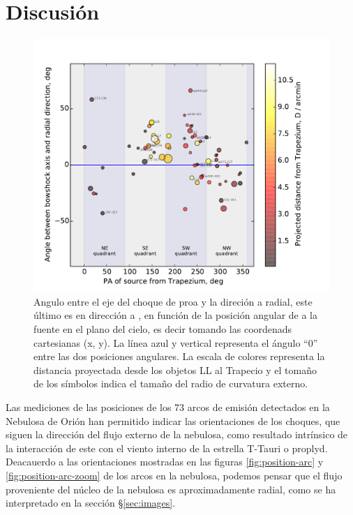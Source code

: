 \section{Discusión}
\label{sec:disc}

\begin{figure}
  \centering
  \includegraphics[width=\linewidth, clip]{luis-programas/will-PA-vs-PA}
  \caption{Angulo entre el eje del choque de proa y la direción a radial, este último es en dirección a \thC{}, en función de la posición angular de \thC{} a la fuente en el plano del cielo, es decir tomando las coordenads cartesianas (x, y). La línea azul y vertical representa el ángulo ``0'' entre las dos posiciones angulares. La escala de colores representa la distancia proyectada desde los objetos LL al Trapecio y el tomaño de los símbolos indica el tamaño del radio de curvatura externo.}
 \label{fig:pos-angular}
\end{figure}

Las mediciones de las posiciones de los 73 arcos de emisión detectados en la Nebulosa de Orión han permitido indicar las orientaciones de los choques, que siguen la dirección del flujo externo de la nebulosa, como resultado intrínsico de la interacción de este con el viento interno de la estrella T-Tauri o proplyd. Deacauerdo a las orientaciones mostradas en las  figuras \ref{fig:position-arc} y \ref{fig:position-arc-zoom} de los arcos en la nebulosa, podemos pensar que el flujo proveniente del núcleo de la nebulosa es aproximadamente radial, como se ha interpretado en la sección \S\ref{sec:images}.\\

